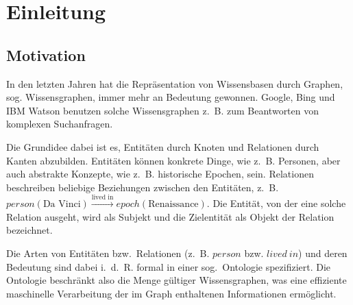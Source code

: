 \chapter{Einleitung}%
\label{sec:intro}

\setcounter{page}{1}			%


\section{Motivation}%
\label{sec:intro:motivation}

In den letzten Jahren hat die Repräsentation von Wissensbasen durch Graphen, sog. Wissensgraphen, immer mehr an Bedeutung gewonnen.
Google, Bing und IBM Watson benutzen solche Wissensgraphen z.~B. zum Beantworten von komplexen Suchanfragen.

Die Grundidee dabei ist es, Entitäten durch Knoten und Relationen durch Kanten abzubilden.
Entitäten können konkrete Dinge, wie z.~B. Personen, aber auch abstrakte Konzepte, wie z.~B. historische Epochen, sein.
Relationen beschreiben beliebige Beziehungen zwischen den Entitäten, z.~B. $person(\text{Da~Vinci}) \xrightarrow{\text{lived~in}} epoch(\text{Renaissance})$.
Die Entität, von der eine solche Relation ausgeht, wird als Subjekt und die Zielentität als Objekt der Relation bezeichnet.

Die Arten von Entitäten bzw.\ Relationen (z.~B. $person$ bzw. $lived~in$) und deren Bedeutung sind dabei i.~d.~R. formal in einer sog.\ Ontologie spezifiziert.
Die Ontologie beschränkt also die Menge gültiger Wissensgraphen, was eine effiziente maschinelle Verarbeitung der im Graph enthaltenen Informationen ermöglicht.


